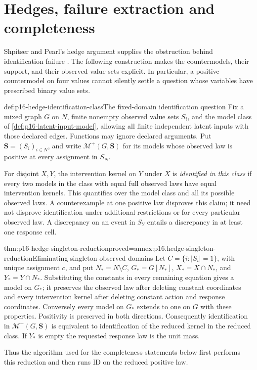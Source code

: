 \section{Hedges, failure extraction and completeness}
\label{sec:p16-hedges-and-completeness}

Shpitser and Pearl's hedge argument supplies the obstruction behind
identification failure \cite[Definitions~5--6, Theorems~4--7 and
Corollaries~2--4, pp.~1222--1226]{ShpitserPearl2006JointIdentification}.
The following construction makes the countermodels, their support,
and their observed value sets explicit. In particular, a positive
countermodel on four values cannot silently settle a question whose
variables have prescribed binary value sets.

\begin{hbdefinition}{def:p16-hedge-identification-class}{The fixed-domain identification question}
Fix a mixed graph \(G\) on \(N\), finite nonempty observed value
sets \(S_i\), and the model class of
\cref{def:p16-latent-input-model}, allowing all finite independent
latent inputs with those declared edges. Functions may ignore declared
arguments. Put \(\mathbf S=(S_i)_{i\in N}\), and write
\(\mathcal M^+(G,\mathbf S)\) for its models whose observed
law is positive at every assignment in \(S_N\).

For disjoint \(X,Y\), the intervention kernel on \(Y\) under
\(X\) is \emph{identified in this class} if every two models in
the class with equal full observed laws have equal intervention
kernels. This quantifies over the model class and all its possible
observed laws. A counterexample at one positive law disproves this
claim; it need not disprove identification under additional restrictions
or for every particular observed law. A discrepancy on an event in
\(S_Y\) entails a discrepancy in at least one response cell.
\end{hbdefinition}

\begin{hbtheorem}{thm:p16-hedge-singleton-reduction}{proved=annex:p16.hedge-singleton-reduction}{Eliminating singleton observed domains}
Let \(C=\{i:|S_i|=1\}\), with unique assignment \(c\), and put
\(N_*=N\setminus C\), \(G_*=G[N_*]\), \(X_*=X\cap N_*\),
and \(Y_*=Y\cap N_*\). Substituting the constants in every
remaining equation gives a model on \(G_*\); it preserves the
observed law after deleting constant coordinates and every intervention
kernel after deleting constant action and response coordinates.
Conversely every model on \(G_*\) extends to one on \(G\)
with these properties. Positivity is preserved in both directions.
Consequently identification in \(\mathcal M^+(G,\mathbf S)\) is equivalent
to identification of the reduced kernel in the reduced class.
If \(Y_*\) is empty the requested response law is the unit mass.

Thus the algorithm used for the completeness statements below first
performs this reduction and then runs ID on the reduced positive law.
\end{hbtheorem}

